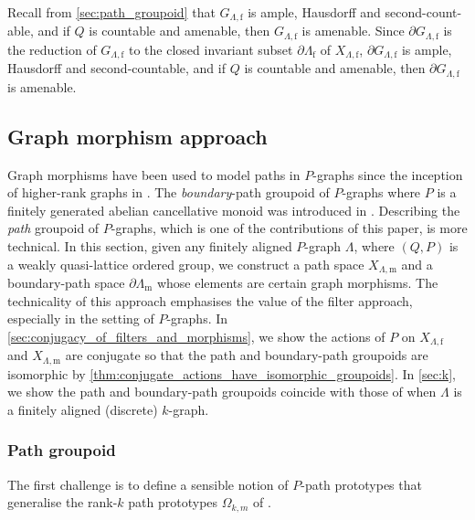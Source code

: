 \documentclass[11pt]{amsart}
\theoremstyle{definition}
\numberwithin{thm}{section}
\numberwithin{equation}{section}
\newcommand{\emphasis}[1]{\textit{#1}}
\newcommand{\M}{\mathrm{m}}
\newcommand{\F}{\mathrm{f}}
\newcommand{\PS}[2]{X_{#2, #1}}
\newcommand{\PG}[2]{{G_{#2, #1}}}
\newcommand{\BPS}[2]{\partial{#2}_{#1}}
\newcommand{\BPG}[2]{\partial\PG{#1}{#2}}
\begin{document}
Recall from \cref{sec:path_groupoid} that $\PG{\F}{\Lambda}$ is ample, Hausdorff and second-count-able, and if $Q$ is countable and amenable, then $\PG{\F}{\Lambda}$ is amenable. 
Since $\BPG{\F}{\Lambda}$ is the reduction of $\PG{\F}{\Lambda}$ to the closed invariant subset $\BPS{\F}{\Lambda}$ of $\PS{\F}{\Lambda}$, $\BPG{\F}{\Lambda}$ is ample, Hausdorff and second-countable, and if $Q$ is countable and amenable, then $\BPG{\F}{\Lambda}$ is amenable.

\subsection{Graph morphism approach}
\label{sec:morphisms}

Graph morphisms have been used to model paths in $P$-graphs since the inception of higher-rank graphs in \cite{KP00}.
The \emphasis{boundary}-path groupoid of $P$-graphs where $P$ is a finitely generated abelian cancellative monoid was introduced in \cite{CKSS14}.
Describing the \emphasis{path} groupoid of $P$-graphs, which is one of the contributions of this paper, is more technical.
In this section, given any finitely aligned $P$-graph $\Lambda$, where $(Q, P)$ is a weakly quasi-lattice ordered group, we construct a path space $\PS{\M}{\Lambda}$ and a boundary-path space $\BPS{\M}{\Lambda}$ whose elements are certain graph morphisms.
The technicality of this approach emphasises the value of the filter approach, especially in the setting of $P$-graphs.
In \cref{sec:conjugacy_of_filters_and_morphisms}, we show the actions of $P$ on $\PS{\F}{\Lambda}$ and $\PS{\M}{\Lambda}$ are conjugate so that the path and boundary-path groupoids are isomorphic by \cref{thm:conjugate_actions_have_isomorphic_groupoids}.
In \cref{sec:k}, we show the path and boundary-path groupoids coincide with those of \cite{Yee07} when $\Lambda$ is a finitely aligned (discrete) 
$k$-graph.

\subsubsection{Path groupoid}

The first challenge is to define a sensible notion of $P$-path prototypes that generalise the rank-$k$ path prototypes $\Omega_{k, m}$ of \cite{Yee07}. 
\end{document}
